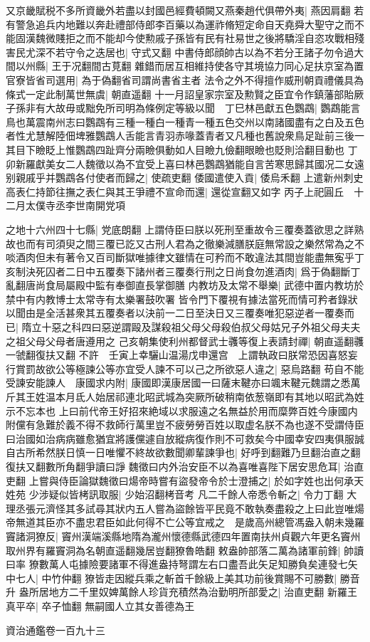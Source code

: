 又京畿賦税不多所資畿外若盡以封國邑經費頓闕又燕秦趙代俱帶外夷|{
	燕因肩翻}
若有警急追兵内地難以奔赴禮部侍郎李百藥以為運祚脩短定命自天堯舜大聖守之而不能固漢魏微賤拒之而不能却今使勲戚子孫皆有民有社易世之後將驕淫自恣攻戰相殘害民尤深不若守令之迭居也|{
	守式又翻}
中書侍郎顔帥古以為不若分王諸子勿令過大間以州縣|{
	王于况翻間古莧翻}
雜錯而居互相維持使各守其境協力同心足扶京室為置官寮皆省司選用|{
	為于偽翻省司謂尚書省主者}
法令之外不得擅作威刑朝貢禮儀具為條式一定此制萬世無虞|{
	朝直遥翻}
十一月詔皇家宗室及勲賢之臣宜令作鎮藩部貽厥子孫非有大故毋或黜免所司明為條例定等級以聞　丁巳林邑獻五色鸚鵡|{
	鸚鵡能言鳥也萬震南州志曰鸚鵡有三種一種白一種青一種五色交州以南諸國盡有之白及五色者性尤慧解陸佃埤雅鸚鵡人舌能言青羽赤喙蓋青者又凡種也舊說衆鳥足趾前三後一其目下瞼眨上惟鸚鵡四趾齊分兩瞼俱動如人目瞼九儉翻眼瞼也貶則洽翻目動也}
丁卯新羅獻美女二人魏徵以為不宜受上喜曰林邑鸚鵡猶能自言苦寒思歸其國况二女遠别親戚乎并鸚鵡各付使者而歸之|{
	使疏吏翻}
倭國遣使入貢|{
	倭烏禾翻}
上遣新州刺史高表仁持節往撫之表仁與其王爭禮不宣命而還|{
	還從宣翻又如字}
丙子上祀圓丘　十二月太僕寺丞李世南開党項

之地十六州四十七縣|{
	党底朗翻}
上謂侍臣曰朕以死刑至重故令三覆奏蓋欲思之詳熟故也而有司須臾之間三覆已訖又古刑人君為之徹樂減膳朕庭無常設之樂然常為之不啖酒肉但未有著令又百司斷獄唯據律文雖情在可矜而不敢違法其間豈能盡無寃乎丁亥制決死囚者二日中五覆奏下諸州者三覆奏行刑之日尚食勿進酒肉|{
	爲于偽翻斷丁亂翻唐尚食局屬殿中監有奉御直長掌御膳}
内教坊及太常不舉樂|{
	武德中置内教坊於禁中有内教博士太常寺有太樂署鼓吹署}
皆令門下覆視有據法當死而情可矜者錄狀以聞由是全活甚衆其五覆奏者以決前一二日至決日又三覆奏唯犯惡逆者一覆奏而已|{
	隋立十惡之科四曰惡逆謂毆及謀殺祖父母父母殺伯叔父母姑兄子外祖父母夫夫之祖父母父母者唐遵用之}
己亥朝集使利州都督武士彠等復上表請封禪|{
	朝直遥翻彠一虢翻復扶又翻}
不許　壬寅上幸驪山温湯戊申還宫　上謂執政曰朕常恐因喜怒妄行賞罰故欲公等極諫公等亦宜受人諫不可以己之所欲惡人違之|{
	惡烏路翻}
苟自不能受諫安能諫人　康國求内附|{
	康國即漢康居國一曰薩末鞬亦曰颯末鞬元魏謂之悉萬斤其王姓温本月氐人始居祁連北昭武城為突厥所破稍南依葱嶺即有其地以昭武為姓示不忘本也}
上曰前代帝王好招來絶域以求服遠之名無益於用而糜弊百姓今康國内附儻有急難於義不得不救師行萬里豈不疲勞勞百姓以取虚名朕不為也遂不受謂侍臣曰治國如治病病雖愈猶宜將護儻遽自放縱病復作則不可救矣今中國幸安四夷俱服誠自古所希然朕日慎一日唯懼不終故欲數聞卿輩諫爭也|{
	好呼到翻難乃旦翻治直之翻復扶又翻數所角翻爭讀曰諍}
魏徵曰内外治安臣不以為喜唯喜陛下居安思危耳|{
	治直吏翻}
上嘗與侍臣論獄魏徵曰煬帝時嘗有盜發帝令於士澄捕之|{
	於如字姓也出何承天姓苑}
少涉疑似皆栲訊取服|{
	少始沼翻栲音考}
凡二千餘人帝悉令斬之|{
	令力丁翻}
大理丞張元濟怪其多試尋其狀内五人嘗為盜餘皆平民竟不敢執奏盡殺之上曰此豈唯煬帝無道其臣亦不盡忠君臣如此何得不亡公等宜戒之　是歲高州總管馮盎入朝未幾羅竇諸洞獠反|{
	竇州漢端溪縣地隋為瀧州懷德縣武德四年置南扶州貞觀六年更名竇州取州界有羅竇洞為名朝直遥翻幾居豈翻獠魯皓翻}
敕盎帥部落二萬為諸軍前鋒|{
	帥讀曰率}
獠數萬人屯據險要諸軍不得進盎持弩謂左右口盡吾此矢足知勝負矣連發七矢中七人|{
	中竹仲翻}
獠皆走因縱兵乘之斬首千餘級上美其功前後賞賜不可勝數|{
	勝音升}
盎所居地方二千里奴婢萬餘人珍貨充積然為治勤明所部愛之|{
	治直吏翻}
新羅王真平卒|{
	卒子恤翻}
無嗣國人立其女善德為王

資治通鑑卷一百九十三
